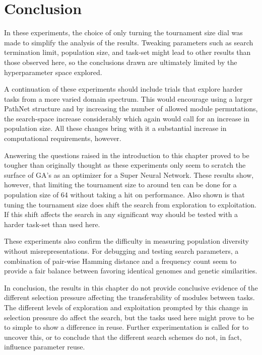 \section{Conclusion}
In these experiments, the choice of only turning the tournament size dial was made to simplify the analysis of the results. Tweaking parameters such as search termination limit, population size, and  task-set might lead to other results than those observed here, so the conclusions drawn are ultimately limited by the hyperparameter space explored. 

A continuation of these experiments should include trials that explore harder tasks from a more varied domain spectrum. This would encourage using a larger PathNet structure and by increasing the number of allowed module permutations, the search-space increase considerably which again would call for an increase in population size. All these changes bring with it a substantial increase in computational requirements, however.

Answering the questions raised in the introduction to this chapter proved to be tougher than originally thought as these experiments only seem to scratch the surface of GA's as an optimizer for a Super Neural Network. These results show, however, that limiting the tournament size to around ten can be done for a population size of 64 without taking a hit on performance. Also shown is that tuning the tournament size does shift the search from exploration to exploitation. If this shift affects the search in any significant way should be tested with a harder task-set than used here. 

These experiments also confirm the difficulty in measuring population diversity without misrepresentations. For debugging and testing search parameters, a combination of pair-wise Hamming distance and a frequency count seem to provide a fair balance between favoring identical genomes and genetic similarities.  

In conclusion, the results in this chapter do not provide conclusive evidence of the different selection pressure affecting the transferability of modules between tasks. The different levels of exploration and exploitation prompted by this change in selection pressure do affect the search, but the tasks used here might prove to be to simple to show a difference in reuse. Further experimentation is called for to uncover this, or to conclude that the different search schemes do not, in fact, influence parameter reuse.
